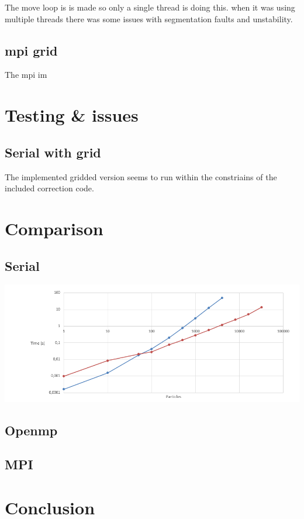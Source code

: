 \documentclass[a4paper,10pt,titlepage]{report}
\begin{document}
The move loop is is made so only a single thread is doing this. when it was using multiple threads there was some issues with segmentation faults and unstability. \\

\subsection{mpi grid}
The mpi im


\section{Testing \& issues}

\subsection{Serial with grid}
The implemented gridded version seems to run within the constriains of the included correction code.

\section{Comparison}

\subsection{Serial}
\includegraphics[scale=0.3]{oldvsnew}

\subsection{Openmp}

\subsection{MPI}

\section{Conclusion}
\newpage
\end{document}
